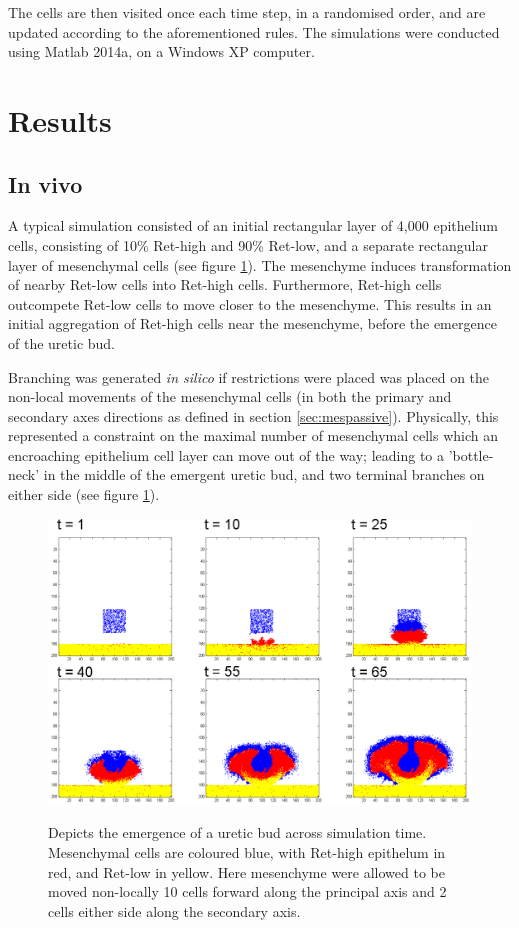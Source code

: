 \documentclass[pdftex,10pt,a4paper,twocolumn]{article}
\begin{document}
The cells are then visited once each time step, in a randomised order, and are updated according to the aforementioned rules. The simulations were conducted using Matlab 2014a, on a Windows XP computer.

\section{Results}\label{sec:results}
\subsection{In vivo}\label{sec:quantresults}
A typical simulation consisted of an initial rectangular layer of 4,000 epithelium cells, consisting of 10\% Ret-high and 90\% Ret-low, and a separate rectangular layer of mesenchymal cells (see figure \ref{fig:emergent}). The mesenchyme induces transformation of nearby Ret-low cells into Ret-high cells. Furthermore, Ret-high cells outcompete Ret-low cells to move closer to the mesenchyme. This results in an initial aggregation of Ret-high cells near the mesenchyme, before the emergence of the uretic bud. 

Branching was generated \textit{in silico} if restrictions were placed was placed on the non-local movements of the mesenchymal cells (in both the primary and secondary axes directions as defined in section \ref{sec:mespassive}). Physically, this represented a constraint on the maximal number of mesenchymal cells which an encroaching epithelium cell layer can move out of the way; leading to a 'bottle-neck' in the middle of the emergent uretic bud, and two terminal branches on either side (see figure \ref{fig:emergent}).

\begin{figure}[t] 
\centering
\scalebox{0.93} 
{\includegraphics{emergent.eps}}
\caption{Depicts the emergence of a uretic bud across simulation time. Mesenchymal cells are coloured blue, with Ret-high epithelum in red, and Ret-low in yellow. Here mesenchyme were allowed to be moved non-locally 10 cells forward along the principal axis and 2 cells either side along the secondary axis.}\label{fig:emergent}
\end{figure} 
\end{document}
